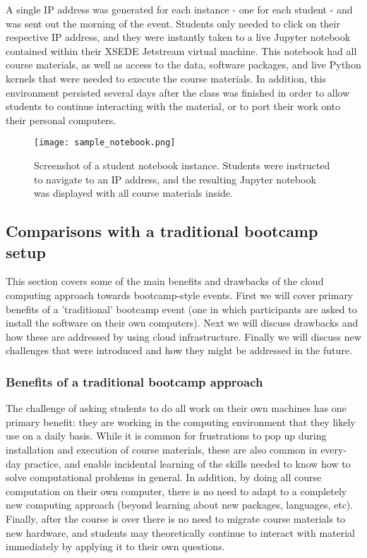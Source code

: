 \begin{enumerate}
A single IP address was generated for each instance - one
for each student - and was sent out the morning of the event. Students only
needed to click on their respective IP address, and they were instantly taken to
a live Jupyter notebook contained within their XSEDE Jetstream virtual
machine. This notebook had all course materials, as well as access to the
data, software packages, and live Python kernels that were needed to execute the
course materials. In addition, this environment persisted several days after the
class was finished in order to allow students to continue interacting with the
material, or to port their work onto their personal computers.

\end{enumerate}

\begin{figure}[h]
\centering
\texttt{[image: sample\_notebook.png]}
\caption{Screenshot of a student notebook instance. Students were instructed to
         navigate to an IP address, and the resulting Jupyter notebook was
         displayed with all course materials inside.}
\end{figure}

\subsection{Comparisons with a traditional bootcamp setup}

This section covers some of the main benefits and drawbacks of the cloud
computing approach towards bootcamp-style events. First we will cover primary
benefits of a 'traditional' bootcamp event (one in which participants are asked
to install the software on their own computers). Next we will discuss drawbacks
and how these are addressed by using cloud infrastructure. Finally we will
discuss new challenges that were introduced and how they might be addressed in
the future.

\subsubsection{Benefits of a traditional bootcamp approach}

The challenge of asking students to do all work on their own machines has one
primary benefit: they are working in the computing environment that they
likely use on a daily basis. While it is common for frustrations to pop up
during installation and execution of course materials, these are also
common in every-day practice, and enable incidental learning
of the skills needed to know how to solve computational problems in general.
In addition, by doing all course computation on
their own computer, there is no need to adapt to a completely new computing
approach (beyond learning about new packages, languages, etc). Finally, after
the course is over there is no need to migrate course materials to new hardware,
and students may theoretically continue to interact with material immediately by applying
it to their own questions.


